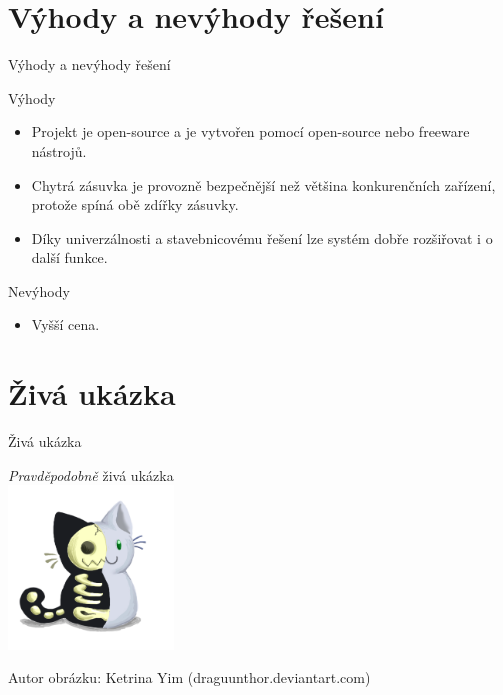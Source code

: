 \documentclass[11pt]{beamer}
\begin{document}
\section{Výhody a nevýhody řešení}

\begin{frame}{Výhody a nevýhody řešení}
  \begin{exampleblock}{Výhody}
    \begin{itemize}
      \item Projekt je open-source a je vytvořen pomocí open-source nebo freeware nástrojů.
      \item Chytrá zásuvka je provozně bezpečnější než většina konkurenčních zařízení, protože spíná obě zdířky zásuvky.
      \item Díky univerzálnosti a stavebnicovému řešení lze systém dobře rozšiřovat i o další funkce.
    \end{itemize}
  \end{exampleblock}
  \begin{alertblock}{Nevýhody}
    \begin{itemize}
      \item Vyšší cena.
    \end{itemize}
  \end{alertblock}
\end{frame}

\section{Živá ukázka}
\begin{frame}{Živá ukázka}
  \begin{center}
    \huge{\textit{Pravděpodobně} živá ukázka} \\
    \vspace{8mm}
    \includegraphics[width = 0.33\textwidth]{../img/kocka.png}
    \vspace{8mm}
  \end{center}
  \small{Autor obrázku: Ketrina Yim (draguunthor.deviantart.com)}
\end{frame}
\end{document}
